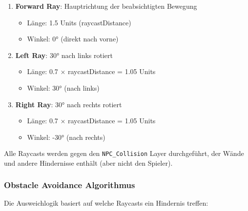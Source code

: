 \documentclass[
  a4paper,
  11pt,
  ngerman,
  parskip=half,
  bibliography=totoc,
  listof=totoc
]{scrreprt}
\begin{document}
\begin{enumerate}
    \item \textbf{Forward Ray}: Hauptrichtung der beabsichtigten Bewegung
    \begin{itemize}
        \item Länge: 1.5 Units (raycastDistance)
        \item Winkel: 0° (direkt nach vorne)
    \end{itemize}

    \item \textbf{Left Ray}: 30° nach links rotiert
    \begin{itemize}
        \item Länge: 0.7 $\times$ raycastDistance = 1.05 Units
        \item Winkel: 30° (nach links)
    \end{itemize}

    \item \textbf{Right Ray}: 30° nach rechts rotiert
    \begin{itemize}
        \item Länge: 0.7 $\times$ raycastDistance = 1.05 Units
        \item Winkel: -30° (nach rechts)
    \end{itemize}
\end{enumerate}

Alle Raycasts werden gegen den \texttt{NPC\_Collision} Layer durchgeführt, der Wände und andere Hindernisse enthält (aber nicht den Spieler).

\subsubsection{Obstacle Avoidance Algorithmus}

Die Ausweichlogik basiert auf welche Raycasts ein Hindernis treffen:
\end{document}
